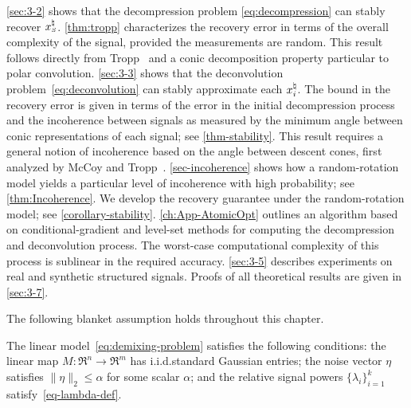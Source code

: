 \autoref{sec:3-2} shows that the decompression problem \eqref{eq:decompression} can stably recover $x_{\scriptscriptstyle S}^{\natural}$. \autoref{thm:tropp} characterizes the recovery error in terms of the overall complexity of the signal, provided the measurements are random. This result follows directly from Tropp~\cite{tropp2015convex} and a conic decomposition property particular to polar convolution. \autoref{sec:3-3} shows that the deconvolution problem~\eqref{eq:deconvolution} can stably approximate each $x_i^{\natural}$. The bound in the recovery error is given in terms of the error in the initial decompression process and the incoherence between signals as measured by the minimum angle between conic representations of each signal; see \autoref{thm-stability}. This result requires a general notion of incoherence based on the angle between descent cones, first analyzed by McCoy and Tropp~\cite{mccoy2013achievable}.  \autoref{sec-incoherence} shows how a random-rotation model yields a particular level of incoherence with high probability; see \autoref{thm:Incoherence}. We develop the recovery guarantee under the random-rotation model; see \autoref{corollary-stability}.  \autoref{ch:App-AtomicOpt} outlines an algorithm based on conditional-gradient and level-set methods for computing the decompression and deconvolution process. The worst-case computational complexity of this process is sublinear in the required accuracy. \autoref{sec:3-5} describes experiments on real and synthetic structured signals. Proofs of all theoretical results are given in \autoref{sec:3-7}.

The following blanket assumption holds throughout this chapter.
\begin{assumption}\label{assume-blanket}
  The linear model~\eqref{eq:demixing-problem} satisfies the following conditions: the linear map
  $M:\Re^n\to\Re^m$ has i.i.d.\@ standard Gaussian entries; the noise vector $\eta$ satisfies $\|\eta\|_2\leq \alpha$ for some scalar $\alpha$; and the relative signal powers $\{\lambda_i\}_{i=1}^k$ satisfy~\eqref{eq-lambda-def}.
\end{assumption} 

